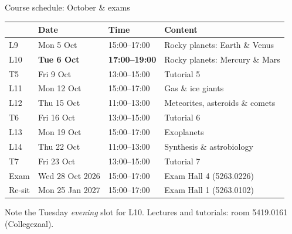 \documentclass[aspectratio=169, 11pt]{beamer}
\begin{document}
\begin{frame}{Course schedule: October \& exams}
  \centering
  \footnotesize
  \setlength{\tabcolsep}{5pt}
  \begin{tabular}{llll}
    \toprule
     & Date & Time & Content \\
    \midrule
    L9  & Mon 5 Oct  & 15:00--17:00 & Rocky planets: Earth \& Venus \\
    L10 & \textbf{Tue 6 Oct} & \textbf{17:00--19:00} & Rocky planets: Mercury \& Mars \\
    T5  & Fri 9 Oct  & 13:00--15:00 & Tutorial 5 \\
    L11 & Mon 12 Oct & 15:00--17:00 & Gas \& ice giants \\
    L12 & Thu 15 Oct & 11:00--13:00 & Meteorites, asteroids \& comets \\
    T6  & Fri 16 Oct & 13:00--15:00 & Tutorial 6 \\
    L13 & Mon 19 Oct & 15:00--17:00 & Exoplanets \\
    L14 & Thu 22 Oct & 11:00--13:00 & Synthesis \& astrobiology \\
    T7  & Fri 23 Oct & 13:00--15:00 & Tutorial 7 \\
    \midrule
    Exam   & Wed 28 Oct 2026 & 15:00--17:00 & Exam Hall 4 (5263.0226) \\
    Re-sit & Mon 25 Jan 2027 & 15:00--17:00 & Exam Hall 1 (5263.0102) \\
    \bottomrule
  \end{tabular}
  \vskip6pt\relax
  {\footnotesize Note the Tuesday \emph{evening} slot for L10. Lectures and tutorials: room 5419.0161 (Collegezaal).}
\end{frame}
\end{document}

